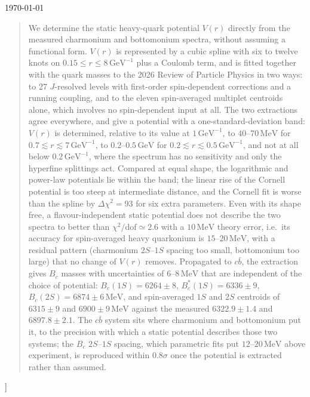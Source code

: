 \documentclass[10pt,twocolumn]{article}
\newcommand{\Bc}{B_c}
\newcommand{\Bcs}{B_c^*}
\newcommand{\cb}{c\bar b}
\newcommand{\MeV}{\,\mathrm{MeV}}
\newcommand{\GeV}{\,\mathrm{GeV}}
\newcommand{\GeVi}{\,\mathrm{GeV}^{-1}}
\begin{document}
\begin{@twocolumnfalse}
\begin{center}
\vspace{2pt}
{\small \today}
\end{center}
\begin{quote}\small
We determine the static heavy-quark potential $V(r)$ directly from the measured charmonium and bottomonium spectra, without assuming a functional form.
$V(r)$ is represented by a cubic spline with six to twelve knots on $0.15\le r\le8\GeVi$ plus a Coulomb term, and is fitted together with the quark masses to the 2026 Review of Particle Physics in two ways: to 27 $J$-resolved levels with first-order spin-dependent corrections and a running coupling, and to the eleven spin-averaged multiplet centroids alone, which involves no spin-dependent input at all.
The two extractions agree everywhere, and give a potential with a one-standard-deviation band: $V(r)$ is determined, relative to its value at $1\GeVi$, to $40$--$70\MeV$ for $0.7\lesssim r\lesssim7\GeVi$, to $0.2$--$0.5\GeV$ for $0.2\lesssim r\lesssim0.5\GeVi$, and not at all below $0.2\GeVi$, where the spectrum has no sensitivity and only the hyperfine splittings act.
Compared at equal shape, the logarithmic and power-law potentials lie within the band; the linear rise of the Cornell potential is too steep at intermediate distance, and the Cornell fit is worse than the spline by $\Delta\chi^2=93$ for six extra parameters.
Even with its shape free, a flavour-independent static potential does not describe the two spectra to better than $\chi^2/\mathrm{dof}\simeq2.6$ with a $10\MeV$ theory error, i.e.\ its accuracy for spin-averaged heavy quarkonium is $15$--$20\MeV$, with a residual pattern (charmonium $2S$--$1S$ spacing too small, bottomonium too large) that no change of $V(r)$ removes.
Propagated to $\cb$, the extraction gives $\Bc$ masses with uncertainties of $6$--$8\MeV$ that are independent of the choice of potential: $\Bc(1S)=6264\pm8$, $\Bcs(1S)=6336\pm9$, $\Bc(2S)=6874\pm6\MeV$, and spin-averaged $1S$ and $2S$ centroids of $6315\pm9$ and $6900\pm9\MeV$ against the measured $6322.9\pm1.4$ and $6897.8\pm2.1$.
The $\cb$ system sits where charmonium and bottomonium put it, to the precision with which a static potential describes those two systems; the $\Bc$ $2S$--$1S$ spacing, which parametric fits put $12$--$20\MeV$ above experiment, is reproduced within $0.8\sigma$ once the potential is extracted rather than assumed.
\end{quote}
\vspace{6pt}
\end{@twocolumnfalse}
]
\end{document}
